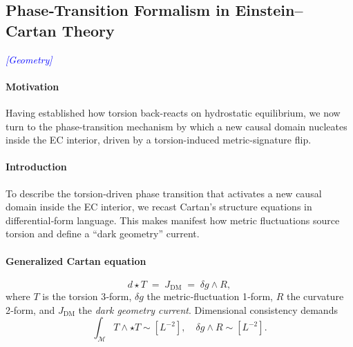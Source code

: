 \documentclass{article}
\newcommand{\geometrytag}{\textcolor{blue}{\textit{[Geometry]}}}
\begin{document}
\medskip
\begin{center}
\end{center}
\medskip



\subsection{Phase‐Transition Formalism in Einstein–Cartan Theory}
\label{sec:phase-transition}
\geometrytag

\paragraph{Motivation}
Having established how torsion back-reacts on hydrostatic equilibrium, we now turn to the phase-transition mechanism by which a new causal domain nucleates inside the EC interior, driven by a torsion-induced metric-signature flip.


\paragraph{Introduction}
To describe the torsion‐driven phase transition that activates a new causal domain inside the EC interior, we recast Cartan’s structure equations in differential‐form language.  This makes manifest how metric fluctuations source torsion and define a “dark geometry” current.

\paragraph{Generalized Cartan equation}
\begin{equation}\label{eq:Cartan-forms}
  d\star T \;=\; J_{\mathrm{DM}} \;=\;\delta g\wedge R,
\end{equation}
where $T$ is the torsion 3‐form, $\delta g$ the metric‐fluctuation 1‐form, $R$ the curvature 2‐form, and $J_{\mathrm{DM}}$ the \emph{dark geometry current}.  Dimensional consistency demands
\begin{equation}
  \int_{\mathcal M}T\wedge\star T \sim [L^{-2}], 
  \quad
  \delta g\wedge R \sim [L^{-2}].
\end{equation}
\end{document}
